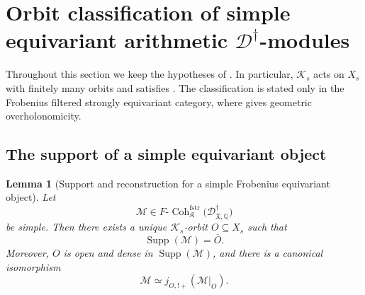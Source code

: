 \documentclass[11pt]{amsart}
\theoremstyle{plain}
\newtheorem{lemma}{Lemma}[section]
\theoremstyle{definition}
\theoremstyle{remark}
\newcommand{\Coh}{\operatorname{Coh}}
\newcommand{\Supp}{\operatorname{Supp}}
\newcommand{\fstr}{\mathrm{fstr}}
\begin{document}
\section{Orbit classification of simple equivariant arithmetic
\texorpdfstring{\(\mathscr D^\dagger\)}{Ddagger}-modules}
\label{sec:classification}

Throughout this section we keep the hypotheses of
. In particular, \(\mathcal K_s\) acts
on \(X_s\) with finitely many orbits and satisfies
.  The classification is stated only in the
Frobenius filtered strongly equivariant category, where
 gives geometric overholonomicity.

\subsection{The support of a simple equivariant object}

\begin{lemma}[Support and reconstruction for a simple Frobenius equivariant object]
\label{lem:support-simple}
Let
\[
  \mathcal M\in
  F\text{-}\Coh^{\fstr}_{\mathfrak K}
  \bigl(\mathscr D^\dagger_{\mathfrak X,\mathbb Q}\bigr)
\]
be simple. Then there exists a unique \(\mathcal K_s\)-orbit \(O\subseteq X_s\)
such that
\[
  \Supp(\mathcal M)=\overline O.
\]
Moreover, \(O\) is open and dense in \(\Supp(\mathcal M)\), and there is a
canonical isomorphism
\[
  \mathcal M\simeq j_{O,!+}(\mathcal M|_O).
\]
\end{lemma}
\end{document}

